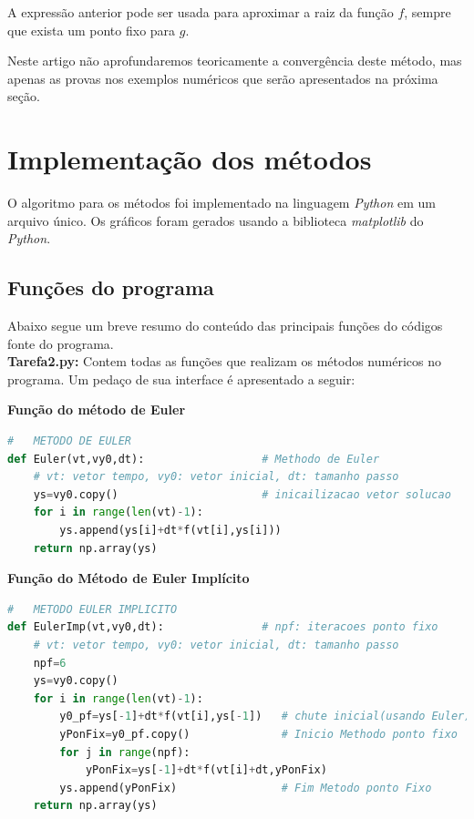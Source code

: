 \documentclass[twocolumn,amsmath,amssymb,floatfix]{revtex4}
\begin{document}
A expressão anterior pode ser usada para aproximar a raiz da função $f$, sempre que exista um ponto fixo para $g$.

Neste artigo não aprofundaremos teoricamente a convergência deste método, mas apenas as provas nos exemplos numéricos que serão apresentados na próxima seção.
\section{Implementação dos métodos}
O algoritmo para os métodos foi implementado na linguagem \textit{Python} em um arquivo único.
Os gr\'aficos foram gerados usando a biblioteca \textit{matplotlib} do \textit{Python}.

\subsection{Funções do programa}
Abaixo segue um breve resumo do conte\'udo das principais funções do c\'odigos fonte do programa.
\\\indent \textbf{ Tarefa2.py:} Contem todas as funções que realizam os métodos numéricos no programa.
Um pedaço de sua interface é apresentado a seguir:

\textbf{Função do método de Euler}
\begin{lstlisting}[language=Python]
#   METODO DE EULER
def Euler(vt,vy0,dt):                  # Methodo de Euler
    # vt: vetor tempo, vy0: vetor inicial, dt: tamanho passo
    ys=vy0.copy()                      # inicailizacao vetor solucao
    for i in range(len(vt)-1):
        ys.append(ys[i]+dt*f(vt[i],ys[i]))
    return np.array(ys)
\end{lstlisting}

\textbf{Função do Método de Euler Implícito}
\begin{lstlisting}[language=Python]
#   METODO EULER IMPLICITO
def EulerImp(vt,vy0,dt):               # npf: iteracoes ponto fixo
    # vt: vetor tempo, vy0: vetor inicial, dt: tamanho passo
    npf=6
    ys=vy0.copy()
    for i in range(len(vt)-1):
        y0_pf=ys[-1]+dt*f(vt[i],ys[-1])   # chute inicial(usando Euler) para usar ponto fixo
        yPonFix=y0_pf.copy()              # Inicio Methodo ponto fixo
        for j in range(npf):
            yPonFix=ys[-1]+dt*f(vt[i]+dt,yPonFix)
        ys.append(yPonFix)                # Fim Metodo ponto Fixo
    return np.array(ys)
\end{lstlisting}
\end{document}
